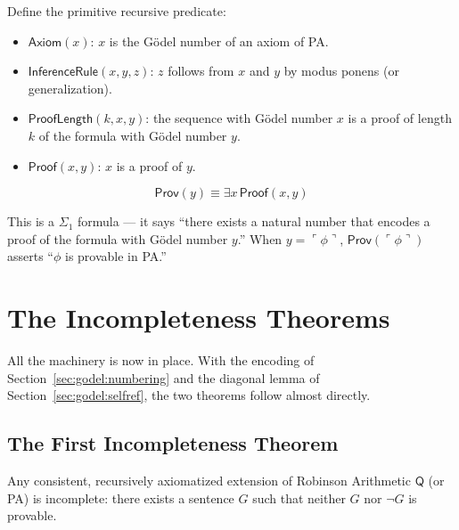 Define the primitive recursive predicate:
\begin{itemize}
\item $\mathsf{Axiom}(x)$: $x$ is the Gödel number of an axiom of PA.
\item $\mathsf{InferenceRule}(x, y, z)$: $z$ follows from $x$ and $y$ by modus ponens (or generalization).
\item $\mathsf{ProofLength}(k, x, y)$: the sequence with Gödel number $x$ is a proof of length $k$ of the formula with Gödel number $y$.
\item $\mathsf{Proof}(x, y)$: $x$ is a proof of $y$.
\end{itemize}

\begin{definition}
\[
\mathsf{Prov}(y) \equiv \exists x\, \mathsf{Proof}(x, y)
\]
\end{definition}

This is a $\Sigma_1$ formula --- it says ``there exists a natural number that encodes a proof of the formula with Gödel number $y$.'' When $y = \ulcorner \phi \urcorner$, $\mathsf{Prov}(\ulcorner \phi \urcorner)$ asserts ``$\phi$ is provable in PA.''

\section{The Incompleteness Theorems}
\label{sec:godel:incompleteness}

All the machinery is now in place. With the encoding of Section~\ref{sec:godel:numbering} and the diagonal lemma of Section~\ref{sec:godel:selfref}, the two theorems follow almost directly.

\subsection{The First Incompleteness Theorem}
\label{sec:godel:first}

\begin{theorem}
Any consistent, recursively axiomatized extension of Robinson Arithmetic $\mathsf{Q}$ (or PA) is incomplete: there exists a sentence $G$ such that neither $G$ nor $\neg G$ is provable.
\end{theorem}

